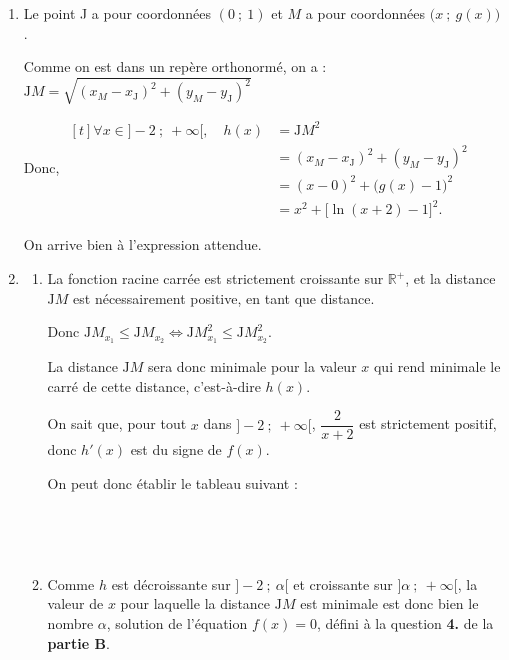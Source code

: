 \documentclass[10pt]{article}
\providecommand{\R}{\mathbb{R}}
\begin{document}
\medskip

\begin{enumerate}
\item Le point J a pour coordonnées $(0~;~1)$ et $M$ a pour coordonnées $\big(x~;~g(x)\big)$.

Comme on est dans un repère orthonormé, on a :\quad $\mathrm{J}M = \sqrt{(x_M - x_\mathrm{J})^2 + (y_M - y_\mathrm{J})^2}$

Donc, \quad $\begin{aligned}[t] \forall x \in ]-2~;~+\infty[,\quad h(x)&=\mathrm{J}M^2\\
	&=(x_{M} - x_{\mathrm{J}})^2 + (y_{M} - y_{\mathrm{J}})^2\\
	&=(x - 0)^2 + \big(g(x) - 1\big)^2\\
	&=x^{2}+\big[\ln (x+2)-1\big]^{2}.\end{aligned}$

On arrive bien à l'expression attendue.

\item \begin{enumerate}
	\item La fonction racine carrée est strictement croissante sur $\R^+$, et la distance $\mathrm{J}M$ est nécessairement positive, en tant que distance.

Donc $\mathrm{J}M_{x_1} \leqslant \mathrm{J}M_{x_2} \iff \mathrm{J}M_{x_1}^2 \leqslant \mathrm{J}M_{x_2}^2$.

La distance $\mathrm{J}M$ sera donc minimale pour la valeur $x$ qui rend minimale le carré de cette distance, c'est-à-dire $h(x)$.
	
On sait que, pour tout $x$ dans $]-2~;~+\infty[$, $\dfrac{2}{x+2}$ est strictement positif, donc $h'(x)$ est du signe de $f(x)$.

On peut donc établir le tableau suivant :

	\hfill~\hfill~

	\item Comme $h$ est décroissante sur $]-2~;~\alpha[$ et croissante sur $]\alpha~;~+\infty[$, la valeur de $x$ pour laquelle la distance $\mathrm{J}M$ est minimale est donc bien le nombre $\alpha$, solution de l'équation $f(x) = 0$, défini à la question \textbf{4.} de la \textbf{partie B}.
\end{enumerate}


\end{enumerate}
\end{document}

